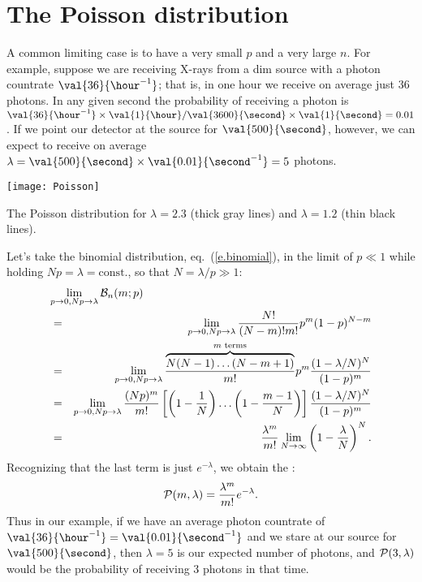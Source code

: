 \section{The Poisson distribution}

A common limiting case is to have a very small $p$ and a very large $n$. For example, suppose we are receiving X-rays from a dim source with a photon countrate $\val{36}{\hour^{-1}}$; that is, in one hour we receive on average just 36 photons.  In any given second the probability of receiving a photon is $\val{36}{\hour^{-1}}\times \val{1}{\hour}/\val{3600}{\second}\times \val{1}{\second} = 0.01$.  If we point our detector at the source for $\val{500}{\second}$, however, we can expect to receive on average $\lambda = \val{500}{\second}\times\val{0.01}{\second^{-1}} = 5$ photons.

\begin{marginfigure}
\texttt{[image: Poisson]}
\caption[The Poisson distribution ]{The Poisson distribution for $\lambda=2.3$ (thick gray lines) and $\lambda=1.2$ (thin black lines).}
\label{f.Poisson}
\end{marginfigure}

Let's take the binomial distribution, eq.~(\ref{e.binomial}), in the limit of $p\ll 1$ while holding $Np=\lambda=\mathrm{const.}$, so that $N = \lambda/p \gg 1$:
\begin{eqnarray*}
	\lefteqn{\lim_{p\to 0,Np\to\lambda}\binom{n}{m}{p}}\\
	 &=& \lim_{p\to 0,Np\to\lambda} \frac{N!}{(N-m)!m!} p^{m} (1-p)^{N-m}\\
	&=& \lim_{p\to 0,Np\to\lambda} \frac{\overbrace{N(N-1)\ldots(N-m+1)}^{\textrm{$m$ terms}}}{m!}p^{m}\frac{(1-\lambda/N)^{N}}{(1-p)^{m}}\\
	&=& \lim_{p\to 0,Np\to\lambda} \frac{(Np)^{m}}{m!}\left[\left(1-\frac{1}{N}\right)\ldots\left(1-\frac{m-1}{N}\right)\right]\frac{(1-\lambda/N)^{N}}{(1-p)^{m}}\\
	&=& \frac{\lambda^{m}}{m!}\lim_{N\to\infty}\left(1-\frac{\lambda}{N}\right)^{N}.
\end{eqnarray*}
Recognizing that the last term is just $e^{-\lambda}$, we obtain the :
\begin{equation}\label{e.Poisson}
	\mathcal{P}(m,\lambda) = \frac{\lambda^{m}}{m!}e^{-\lambda}.
\end{equation}
Thus in our example, if we have an average photon countrate of $\val{36}{\hour^{-1}} = \val{0.01}{\second^{-1}}$ and we stare at our source for $\val{500}{\second}$, then $\lambda = 5$ is our expected number of photons, and $\mathcal{P}(3,\lambda)$ would be the probability of receiving 3 photons in that time.


